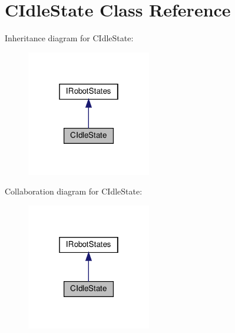 \hypertarget{classCIdleState}{}\section{C\+Idle\+State Class Reference}
\label{classCIdleState}


Inheritance diagram for C\+Idle\+State\+:\nopagebreak
\begin{figure}[H]
\begin{center}
\leavevmode
\includegraphics[width=154pt]{classCIdleState__inherit__graph}
\end{center}
\end{figure}


Collaboration diagram for C\+Idle\+State\+:\nopagebreak
\begin{figure}[H]
\begin{center}
\leavevmode
\includegraphics[width=154pt]{classCIdleState__coll__graph}
\end{center}
\end{figure}
